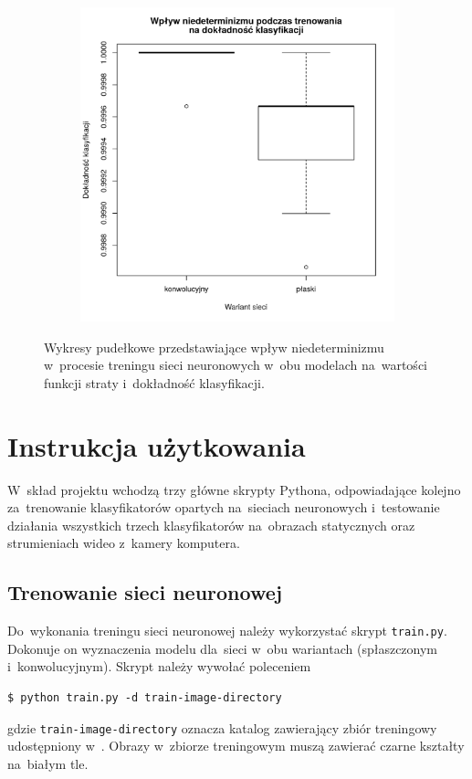 \documentclass[11pt,a4paper]{article}
\begin{document}
\begin{figure}
\begin{subfigure}{0.45\textwidth}
        \includegraphics[width=\textwidth]{res/img/randomness_accuracy.pdf}
    \end{subfigure}
    \caption{Wykresy pudełkowe przedstawiające wpływ niedeterminizmu w~procesie treningu sieci neuronowych w~obu modelach na~wartości funkcji straty i~dokładność klasyfikacji.}
    \label{fig:nondeterminism}
\end{figure}

\section{Instrukcja użytkowania}

W~skład projektu wchodzą trzy główne skrypty Pythona, odpowiadające kolejno za~trenowanie klasyfikatorów opartych na~sieciach neuronowych i~testowanie działania wszystkich trzech klasyfikatorów na~obrazach statycznych oraz strumieniach wideo z~kamery komputera. 

\subsection{Trenowanie sieci neuronowej}

Do~wykonania treningu sieci neuronowej należy wykorzystać skrypt \verb+train.py+.
Dokonuje on wyznaczenia modelu dla~sieci w~obu wariantach (spłaszczonym i~konwolucyjnym).
Skrypt należy wywołać poleceniem
\begin{verbatim}
$ python train.py -d train-image-directory
\end{verbatim}
gdzie \verb+train-image-directory+ oznacza katalog zawierający zbiór treningowy udostępniony w~\cite{shapes}.
Obrazy w~zbiorze treningowym muszą zawierać czarne kształty na~białym tle.
\end{document}
